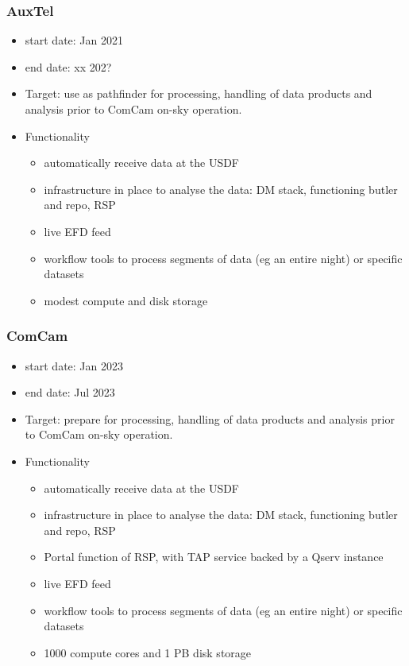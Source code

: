 \subsubsection{AuxTel}

\begin{itemize}

\item start date: Jan 2021
\item end date: xx 202?
\item Target: use as pathfinder for processing, handling of data
  products and analysis prior to ComCam on-sky operation.
\item Functionality
  \begin{itemize}
  \item automatically receive data at the USDF
    \item infrastructure in place to analyse the data: DM stack,
      functioning butler and repo, RSP
    \item live EFD feed
      \item workflow tools to process segments of data (eg an entire
        night) or specific datasets
        \item modest compute and disk storage
        \end{itemize}
      \end{itemize}

\subsubsection{ComCam}

  \begin{itemize}
\item start date: Jan 2023
\item end date: Jul 2023
\item Target: prepare for processing, handling of data
  products and analysis prior to ComCam on-sky operation.
\item Functionality
  \begin{itemize}
  \item automatically receive data at the USDF
    \item infrastructure in place to analyse the data: DM stack,
      functioning butler and repo, RSP
      \item Portal function of RSP, with TAP service backed by a Qserv instance
    \item live EFD feed
      \item workflow tools to process segments of data (eg an entire
        night) or specific datasets
      \item 1000 compute cores and 1 PB disk storage
      \end{itemize}
      \end{itemize}

